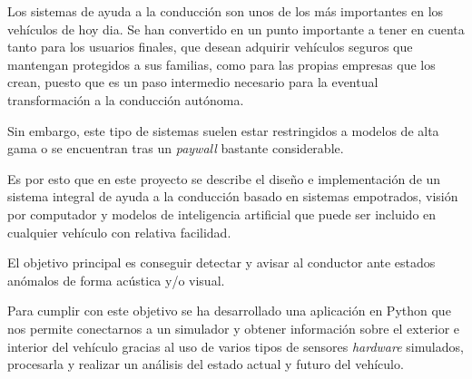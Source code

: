 \label{sec_resumen}

Los sistemas de ayuda a la conducción son unos de los más importantes en los vehículos de hoy dia. Se han convertido en un punto importante a tener en cuenta tanto para los usuarios finales, que desean adquirir vehículos seguros que mantengan protegidos a sus familias, como para las propias empresas que los crean, puesto que es un paso intermedio necesario para la eventual transformación a la conducción autónoma.

Sin embargo, este tipo de sistemas suelen estar restringidos a modelos de alta gama o se encuentran tras un \textit{paywall} bastante considerable. 

Es por esto que en este proyecto se describe el diseño e implementación de un sistema integral de ayuda a la conducción basado en sistemas empotrados, visión por computador y modelos de inteligencia artificial que puede ser incluido en cualquier vehículo con relativa facilidad.

El objetivo principal es conseguir detectar y avisar al conductor ante estados anómalos de forma acústica y/o visual.

Para cumplir con este objetivo se ha desarrollado una aplicación en Python que nos permite conectarnos a un simulador y obtener información sobre el exterior e interior del vehículo gracias al uso de varios tipos de sensores \textit{hardware} simulados, procesarla y realizar un análisis del estado actual y futuro del vehículo.
